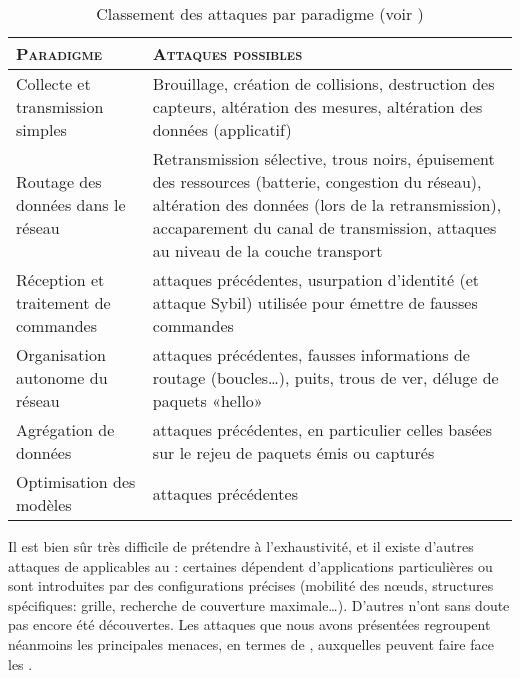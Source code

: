 \begin{table}[!ht]
    \caption{Classement des attaques par paradigme (voir )}\label{ea:tab:paradigm}
    \centering
    \medskip
    \begin{small}
        \begin{tabular}{m{}|m{}}
            \toprule
            \textsc{Paradigme} & \textsc{Attaques possibles}\\
            \midrule
            Collecte et transmission simples & Brouillage, création de collisions, destruction des capteurs, altération des mesures, altération des données (applicatif)\\
            \midrule
            Routage des données dans le réseau & Retransmission sélective, trous noirs, épuisement des ressources (batterie, congestion du réseau), altération des données (lors de la retransmission), accaparement du canal de transmission, attaques au niveau de la couche transport\\
            \midrule
            Réception et traitement de commandes & attaques précédentes, usurpation d'identité (et attaque Sybil) utilisée pour émettre de fausses commandes\\
            \midrule
            Organisation autonome du réseau & attaques précédentes, fausses informations de routage (boucles\dots), puits, trous de ver, déluge de paquets «hello»\\
            \midrule
            Agrégation de données & attaques précédentes, en particulier celles basées sur le rejeu de paquets émis ou capturés\\
            \midrule
            Optimisation des modèles & attaques précédentes\\
            \bottomrule
         \end{tabular}
     \end{small}
\end{table}

Il est bien sûr très difficile de prétendre à l'exhaustivité, et il existe d'autres attaques de \dds applicables au \rcs: certaines dépendent d'applications particulières ou sont introduites par des configurations précises (mobilité des nœuds, structures spécifiques: grille, recherche de couverture maximale\dots).
D'autres n'ont sans doute pas encore été découvertes.
Les attaques que nous avons présentées regroupent néanmoins les principales menaces, en termes de \dds, auxquelles peuvent faire face les \rcs.

